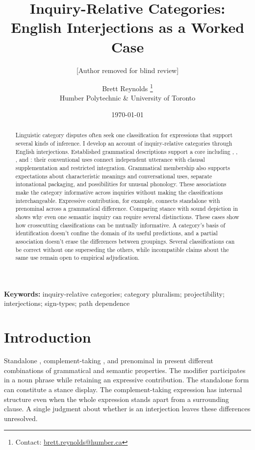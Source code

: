 \documentclass[12pt]{article}
\title{Inquiry-Relative Categories:\\English Interjections as a Worked Case}
\author{[Author removed for blind review]}
\author{Brett Reynolds \orcidlink{0000-0003-0073-7195}%
\thanks{Contact: \href{mailto:brett.reynolds@humber.ca}{brett.reynolds@humber.ca}}\\
Humber Polytechnic \& University of Toronto}
\date{\today}
\begin{document}
\maketitle

\begin{abstract}
Linguistic category disputes often seek one classification for expressions
that support several kinds of inference. I develop an account of
inquiry-relative categories through English interjections. Established
grammatical descriptions support a core including ,
, , and : their conventional uses
connect independent utterance with clausal supplementation and restricted
integration. Grammatical membership also supports expectations about
characteristic meanings and conversational uses, separate intonational
packaging, and possibilities for unusual phonology. These associations
make the category informative across inquiries without making the
classifications interchangeable. Expressive contribution, for example, connects standalone
 with prenominal  across a grammatical
difference. Comparing stance with sound depiction in 
shows why even one semantic inquiry can require several distinctions.
These cases show how crosscutting classifications can be mutually
informative. A category's basis of identification doesn't confine the
domain of its useful predictions, and a partial association doesn't
erase the differences between groupings. Several classifications can
be correct without one superseding the others, while incompatible
claims about the same use remain open to empirical adjudication.
\end{abstract}

\noindent\textbf{Keywords:} inquiry-relative categories; category pluralism;
projectibility; interjections; sign-types; path dependence


\section{Introduction}\label{sec:intro}

Standalone , complement-taking ,
and prenominal  in  present different
combinations of grammatical and semantic properties. The modifier participates
in a noun phrase while retaining an expressive contribution. The standalone
form can constitute a stance display. The complement-taking expression has
internal structure even when the whole expression stands apart from a
surrounding clause. A single judgment about whether  is an
interjection leaves these differences unresolved.
\end{document}

